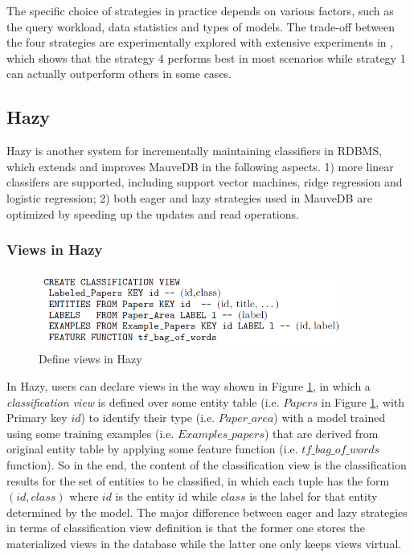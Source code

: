 The specific choice of strategies in practice depends on various factors, such as the query workload, data statistics and types of models. The trade-off between the four strategies are experimentally explored with extensive experiments in \cite{deshpande2006mauvedb}, which shows that the strategy 4 performs best in most scenarios while strategy 1 can actually outperform others in some cases.

\subsection{Hazy}
Hazy is another system for incrementally maintaining classifiers in RDBMS, which extends and improves MauveDB in the following aspects. 1) more linear classifers are supported, including support vector machines, ridge regression and logistic regression; 2) both eager and lazy strategies used in MauveDB are optimized by speeding up the updates and read operations.

\subsubsection{Views in Hazy}
\begin{figure}
    \centering
    \includegraphics[width=10cm, height=2.5cm]{Figures/Hazy_view.png}
    \caption{Define views in Hazy}
    \label{fig:Hazy_view_def}
\end{figure}

In Hazy, users can declare views in the way shown in Figure \ref{fig:Hazy_view_def}, in which a {\em classification view} is defined over some entity table (i.e. $Papers$ in Figure \ref{fig:Hazy_view_def}, with Primary key $id$) to identify their type (i.e. $Paper\_area$) with a model trained using some training examples (i.e. $Examples\_papers$) that are derived from original entity table by applying some feature function (i.e. $tf\_bag\_of\_words$ function). So in the end, the content of the classification view is the classification results for the set of entities to be classified, in which each tuple has the form $(id, class)$ where $id$ is the entity id while $class$ is the label for that entity determined by the model. The major difference between eager and lazy strategies in terms of classification view definition is that the former one stores the materialized views in the database while the latter one only keeps views virtual.

